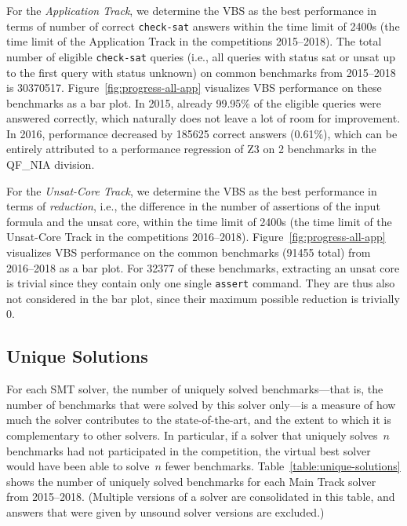 \documentclass[dvipsnames,table,twoside,11pt]{article}
\newcommand{\maintrack}{Main Track\xspace}
\newcommand{\apptrack}{Application Track\xspace}
\newcommand{\ucoretrack}{Unsat-Core Track\xspace}
\begin{document}
For the \emph{\apptrack}, we determine the VBS as the best performance
in terms of number of correct \texttt{check-sat} answers within the time limit
of 2400s (the time limit of the \apptrack in the competitions
2015--2018).
The total number of eligible \texttt{check-sat} queries (i.e., all queries with
status sat or unsat up to the first query with status unknown) on
common benchmarks from 2015--2018 is \num{30370517}.
Figure~\ref{fig:progress-all-app} visualizes VBS performance on these
benchmarks as a bar plot.
In 2015, already 99.95\% of the eligible queries were answered correctly,
which naturally does not leave a lot of room for improvement.
In 2016, performance decreased by \num{185625} correct answers (0.61\%),
which can be entirely attributed to a performance regression
of Z3 on 2 benchmarks in the QF\_NIA division.

For the \emph{\ucoretrack}, we determine the VBS as the best performance in
terms of \emph{reduction}, i.e., the difference in the number of assertions
of the input formula and the unsat core, within the time limit
of 2400s (the time limit of the \ucoretrack in the competitions
2016--2018).
Figure~\ref{fig:progress-all-app} visualizes VBS performance on the common
benchmarks (\num{91455} total) from 2016--2018 as a bar plot.
For \num{32377} of these benchmarks, extracting an unsat core is trivial since
they contain only one single \texttt{assert} command.
They are thus also not considered in the bar plot, since their maximum
possible reduction is trivially 0.

\subsection{Unique Solutions}

For each SMT solver, the number of uniquely solved benchmarks---that
is, the number of benchmarks that were solved by this solver only---is
a measure of how much the solver contributes to the state-of-the-art,
and the extent to which it is complementary to other solvers.  In
particular, if a solver that uniquely solves~$n$ benchmarks had not
participated in the competition, the virtual best solver would have
been able to solve~$n$ fewer benchmarks.
Table~\ref{table:unique-solutions} shows the number of uniquely solved
benchmarks for each \maintrack solver from 2015--2018.  (Multiple
versions of a solver are consolidated in this table, and answers that
were given by unsound solver versions are excluded.)
\end{document}
